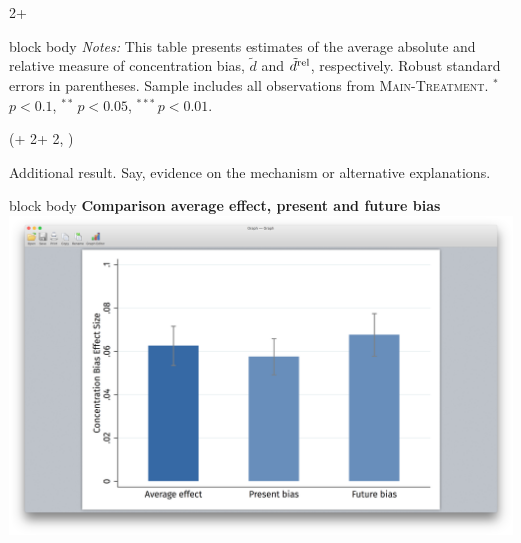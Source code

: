 \documentclass{beamer}
\newlength{\blockTwo}
\begin{document}
\begin{frame}[t]
\begin{textblock*}{2\colwidth + \colsep}
\begin{alertblock}
\begin{beamercolorbox}[ht = 19.75cm, wd = 0.9\linewidth, center]{block body}
		\justifying\small%
		\textit{Notes:}
		This table presents estimates of the average absolute and relative measure of concentration bias, $\tilde{d}$ and $\tilde{d}^{\textup{rel}}$, respectively.
		Robust standard errors in parentheses. Sample includes all observations from \textsc{Main-Treat\-ment}.
		\ensuremath{^{*}}\,\({p < 0.1}\), \ensuremath{^{**}}\,\({p < 0.05}\), \ensuremath{^{***}}\,\({p < 0.01}\).\\[15pt]
	\end{beamercolorbox}
\end{alertblock}

\end{textblock*}




\begin{textblock*}{\colwidth}(\leftmargin + 2\colwidth + 2\colsep, \blockTwo)

\begin{alertblock}{%
	\begin{minipage}[b]{60pt}
		\RaggedRight
		\noindent\hspace{-10pt}
	\end{minipage}%
	\begin{minipage}[b]{\colwidth-125pt}\strut%
		Additional result.\;
		{\mdseries Say, evidence on the mechanism or alternative explanations.}
	\end{minipage}%
}
	\begin{beamercolorbox}[ht = 19.75cm, wd = 0.975\linewidth, center]{block body}
		\textcolor{SpotColor}{\textbf{Comparison average effect, present and future bias}}\\[46pt]
		\includegraphics[width = 0.975\linewidth, trim = {9.5cm 4.5cm 9.5cm 5cm}, clip]
			{1_Example_Content/Images/average_pb_fb.png}\hspace{0.5cm}\null\\[25pt]
	\end{beamercolorbox}
\end{alertblock}


\end{textblock*}
\end{frame}
\end{document}
